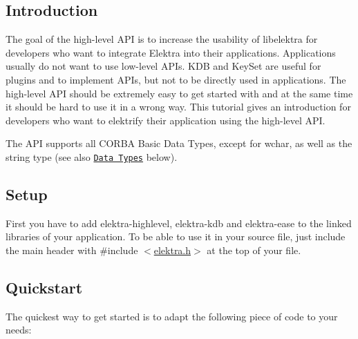\subsection*{Introduction}

The goal of the high-\/level A\+PI is to increase the usability of libelektra for developers who want to integrate Elektra into their applications. Applications usually do not want to use low-\/level A\+P\+Is. {\ttfamily K\+DB} and {\ttfamily Key\+Set} are useful for plugins and to implement A\+P\+Is, but not to be directly used in applications. The high-\/level A\+PI should be extremely easy to get started with and at the same time it should be hard to use it in a wrong way. This tutorial gives an introduction for developers who want to elektrify their application using the high-\/level A\+PI.

The A\+PI supports all C\+O\+R\+BA Basic Data Types, except for {\ttfamily wchar}, as well as the {\ttfamily string} type (see also \href{#data-types}{\tt Data Types} below).

\subsection*{Setup}

First you have to add {\ttfamily elektra-\/highlevel}, {\ttfamily elektra-\/kdb} and {\ttfamily elektra-\/ease} to the linked libraries of your application. To be able to use it in your source file, just include the main header with {\ttfamily \#include $<$\hyperlink{elektra_8h}{elektra.\+h}$>$} at the top of your file.

\subsection*{Quickstart}

The quickest way to get started is to adapt the following piece of code to your needs\+:


